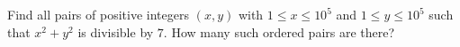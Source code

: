 Find all pairs of positive integers $(x,y)$ with $1\le x\le10^5$ and $1\le y\le10^5$ such that $x^2+y^2$ is divisible by $7$. How many such ordered pairs are there?

